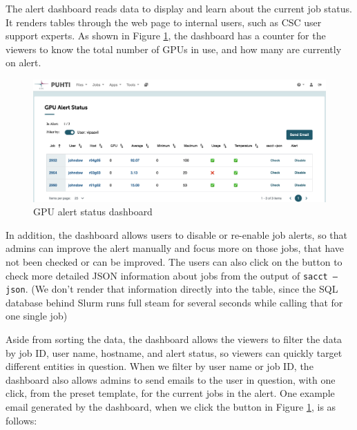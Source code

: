 The alert dashboard reads data to display and learn about the current job status. It renders tables through the web page to internal users, such as CSC user support experts. As shown in Figure \ref{fig_status_dashboard}, the dashboard has a counter for the viewers to know the total number of GPUs in use, and how many are currently on alert. 

\begin{figure}[H]
    \centering
    \includegraphics[width=1.1\textwidth]{figures/status-dashboard.png}
    \caption{GPU alert status dashboard}
    \label{fig_status_dashboard}
\end{figure}

In addition, the dashboard allows users to disable or re-enable job alerts, so that admins can improve the alert manually and focus more on those jobs, that have not been checked or can be improved. The users can also click on the button to check more detailed JSON information about jobs from the output of \texttt{sacct --json}. (We don't render that information directly into the table, since the SQL database behind Slurm runs full steam for several seconds while calling that for one single job)

Aside from sorting the data, the dashboard allows the viewers to filter the data by job ID, user name, hostname, and alert status, so viewers can quickly target different entities in question. When we filter by user name or job ID, the dashboard also allows admins to send emails to the user in question, with one click, from the preset template, for the current jobs in the alert. One example email generated by the dashboard, when we click the button in Figure \ref{fig_status_dashboard}, is as follows:

